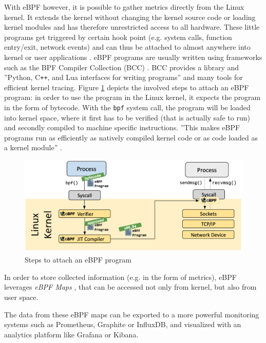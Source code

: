 \documentclass[a4paper,journal]{IEEEtran}
\begin{document}
	With eBPF \cite{ebpf} however, it is possible to gather metrics directly from the Linux kernel. It extends the kernel without changing the kernel source code or loading kernel modules and has therefore unrestricted access to all hardware. These little programs get triggered by certain hook point (e.g. system calls, function entry/exit, network events) and can thus be attached to almost anywhere into kernel or user applications \cite{whatebpf}. eBPF programs are usually written using frameworks such as the BPF Compiler Collection (BCC) \cite{bcc}. BCC provides a library and ''Python, C\texttt{++}, and Lua interfaces for writing programs''\cite{cassagnes2020riseebpfnonintrusive} and many tools for efficient kernel tracing.
	Figure \ref{fig:ebpf:steps} depicts the involved steps to attach an eBPF program: in order to use the program in the Linux kernel, it expects the program in the form of bytecode. With the \texttt{bpf} system call, the program will be loaded into kernel space, where it first has to be verified (that is actually safe to run) and secondly compiled to machine specific instructions. ''This makes eBPF programs run as efficiently as natively compiled kernel code or as code loaded as a kernel module'' \cite{whatebpf}.
	\begin{figure}[h]
		\includegraphics[width=\linewidth]{images/ebpf-steps.png}
		\caption{Steps to attach an eBPF program \cite{whatebpf}}
		\label{fig:ebpf:steps}
	\end{figure}
	In order to store collected information (e.g. in the form of metrics), eBPF leverages \textit{eBPF Maps} \cite{ebpfMaps}, that can be accessed not only from kernel, but also from user space.
	
	The data from these eBPF maps can be exported to a more powerful monitoring systems such as Prometheus, Graphite or InfluxDB, and  visualized with an analytics platform like Grafana or Kibana.
	
	
\end{document}
